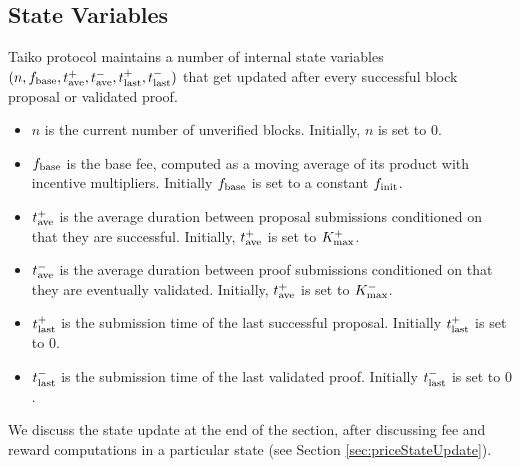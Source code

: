 \subsection{State Variables}
Taiko protocol maintains a number of internal state variables $(n, f_\textnormal{base}, t^+_\textnormal{ave}, t^-_\textnormal{ave}, t^+_\textnormal{last}, t^-_\textnormal{last})$ that get updated after every successful block proposal or validated proof.
\begin{itemize}
    \item $n$ is the current number of unverified blocks. Initially, $n$ is set to $0$.
    \item $f_\textnormal{base}$ is the base fee, computed as a moving average of its product with incentive multipliers. Initially $f_\textnormal{base}$ is set to a constant $f_\textnormal{init}$.
    \item $t^+_\textnormal{ave}$ is the average duration between proposal submissions conditioned on that they are successful. Initially, $t^+_\textnormal{ave}$ is set to $K_\textnormal{max}^+$.
    \item $t^-_\textnormal{ave}$ is the average duration between proof submissions conditioned on that they are eventually validated. Initially, $t^+_\textnormal{ave}$ is set to $K_\textnormal{max}^-$.
    \item $t^+_\textnormal{last}$ is the submission time of the last successful proposal. Initially $t^+_\textnormal{last}$ is set to $0$.
    \item $t^-_\textnormal{last}$ is the submission time of the last validated proof. Initially $t^-_\textnormal{last}$ is set to $0$.
\end{itemize}
We discuss the state update at the end of the section, after discussing fee and reward computations in a particular state (see Section \ref{sec:priceStateUpdate}).





